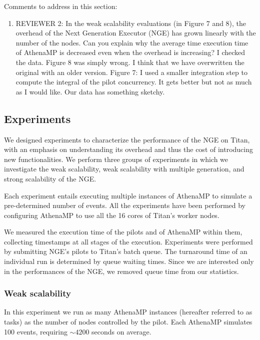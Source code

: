 Comments to address in this section:
\begin{enumerate}
    \item REVIEWER 2: In the weak scalability evaluations (in Figure 7 and
    8), the overhead of the Next Generation Executor (NGE) has grown linearly
    with the number of the nodes. Can you explain why the average time
    execution time of AthenaMP is decreased even when the overhead is
    increasing?
    I checked the data. Figure 8 was simply wrong. I think that we have overwritten the original with an older version.  Figure 7: I used a smaller integration step to compute the integral of the pilot concurrency. It gets better but not as much as I would like. Our data has something sketchy.  
\end{enumerate}

\subsection{Experiments}
\label{sec:ngeExp}

We designed experiments to characterize the performance of the NGE on Titan,
with an emphasis on understanding its overhead and thus the cost of
introducing new functionalities. We perform three groups of experiments in
which we investigate the weak scalability, weak scalability with multiple
generation, and strong scalability of the NGE.

Each experiment entails executing multiple instances of AthenaMP to simulate
a pre-determined number of events. All the experiments have been performed by
configuring AthenaMP to use all the 16 cores of Titan's worker nodes.

We measured the execution time of the pilots and of AthenaMP within them,
collecting timestamps at all stages of the execution. Experiments were
performed by submitting NGE's pilots to Titan's batch queue. The turnaround
time of an individual run is determined by queue waiting times. Since we are
interested only in the performances of the NGE, we removed queue time from
our statistics.

\subsubsection{Weak scalability}

In this experiment we run as many AthenaMP instances (hereafter referred to
as tasks) as the number of nodes controlled by the pilot. Each AthenaMP
simulates 100 events, requiring $\sim 4200$ seconds on average.

